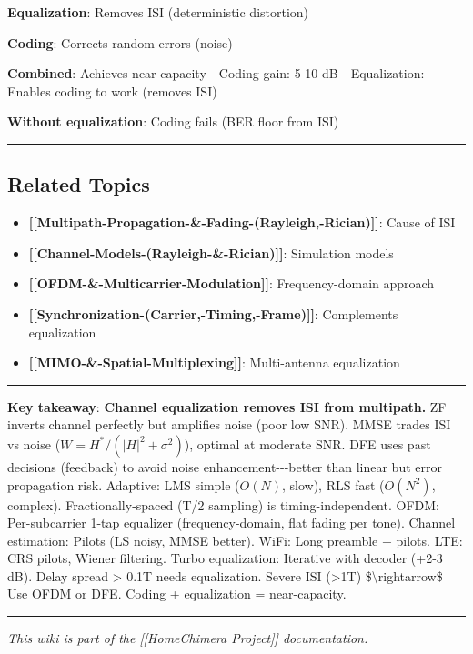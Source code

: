 \textbf{Equalization}: Removes ISI (deterministic distortion)

\textbf{Coding}: Corrects random errors (noise)

\textbf{Combined}: Achieves near-capacity - Coding gain: 5-10 dB -
Equalization: Enables coding to work (removes ISI)

\textbf{Without equalization}: Coding fails (BER floor from ISI)

\begin{center}\rule{0.5\linewidth}{0.5pt}\end{center}

\subsection{Related Topics}\label{related-topics}

\begin{itemize}
\tightlist
\item
  \textbf{{[}{[}Multipath-Propagation-\&-Fading-(Rayleigh,-Rician){]}{]}}:
  Cause of ISI
\item
  \textbf{{[}{[}Channel-Models-(Rayleigh-\&-Rician){]}{]}}: Simulation
  models
\item
  \textbf{{[}{[}OFDM-\&-Multicarrier-Modulation{]}{]}}: Frequency-domain
  approach
\item
  \textbf{{[}{[}Synchronization-(Carrier,-Timing,-Frame){]}{]}}:
  Complements equalization
\item
  \textbf{{[}{[}MIMO-\&-Spatial-Multiplexing{]}{]}}: Multi-antenna
  equalization
\end{itemize}

\begin{center}\rule{0.5\linewidth}{0.5pt}\end{center}

\textbf{Key takeaway}: \textbf{Channel equalization removes ISI from
multipath.} ZF inverts channel perfectly but amplifies noise (poor low
SNR). MMSE trades ISI vs noise (\(W = H^*/(|H|^2 + \sigma^2)\)), optimal
at moderate SNR. DFE uses past decisions (feedback) to avoid noise
enhancement-\/-\/-better than linear but error propagation risk.
Adaptive: LMS simple (\(O(N)\), slow), RLS fast (\(O(N^2)\), complex).
Fractionally-spaced (T/2 sampling) is timing-independent. OFDM:
Per-subcarrier 1-tap equalizer (frequency-domain, flat fading per tone).
Channel estimation: Pilots (LS noisy, MMSE better). WiFi: Long preamble
+ pilots. LTE: CRS pilots, Wiener filtering. Turbo equalization:
Iterative with decoder (+2-3 dB). Delay spread \textgreater{} 0.1T needs
equalization. Severe ISI (\textgreater1T) \$\textbackslash rightarrow\$
Use OFDM or DFE. Coding + equalization = near-capacity.

\begin{center}\rule{0.5\linewidth}{0.5pt}\end{center}

\emph{This wiki is part of the {[}{[}Home\textbar Chimera Project{]}{]}
documentation.}
